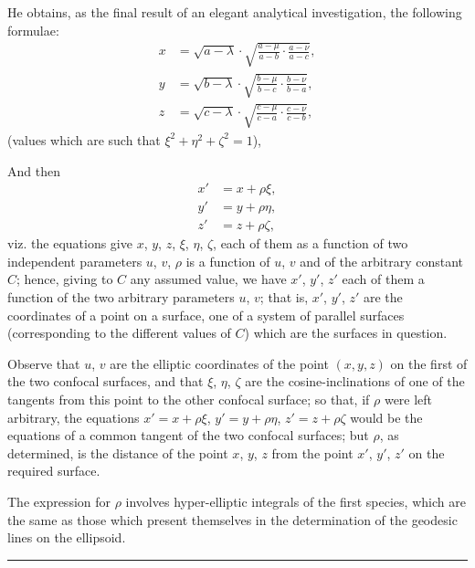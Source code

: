 \documentclass[11pt,a4paper]{article}
\theoremstyle{definition}
\begin{document}
He obtains, as the final result of an elegant analytical investigation, the following formulae:
\begin{align*}
x &= \sqrt{a - \lambda} \cdot \sqrt{\frac{a - \mu}{a - b} \cdot \frac{a - \nu}{a - c}}, \\
y &= \sqrt{b - \lambda} \cdot \sqrt{\frac{b - \mu}{b - c} \cdot \frac{b - \nu}{b - a}}, \\
z &= \sqrt{c - \lambda} \cdot \sqrt{\frac{c - \mu}{c - a} \cdot \frac{c - \nu}{c - b}},
\end{align*}
(values which are such that $\xi^2 + \eta^2 + \zeta^2 = 1$),

And then
\begin{align*}
x' &= x + \rho\xi, \\
y' &= y + \rho\eta, \\
z' &= z + \rho\zeta,
\end{align*}
viz. the equations give $x$, $y$, $z$, $\xi$, $\eta$, $\zeta$, each of them as a function of two independent parameters $u$, $v$, $\rho$ is a function of $u$, $v$ and of the arbitrary constant $C$; hence, giving to $C$ any assumed value, we have $x'$, $y'$, $z'$ each of them a function of the two arbitrary parameters $u$, $v$; that is, $x'$, $y'$, $z'$ are the coordinates of a point on a surface, one of a system of parallel surfaces (corresponding to the different values of $C$) which are the surfaces in question.

Observe that $u$, $v$ are the elliptic coordinates of the point $(x, y, z)$ on the first of the two confocal surfaces, and that $\xi$, $\eta$, $\zeta$ are the cosine-inclinations of one of the tangents from this point to the other confocal surface; so that, if $\rho$ were left arbitrary, the equations $x' = x + \rho\xi$, $y' = y + \rho\eta$, $z' = z + \rho\zeta$ would be the equations of a common tangent of the two confocal surfaces; but $\rho$, as determined, is the distance of the point $x$, $y$, $z$ from the point $x'$, $y'$, $z'$ on the required surface.

The expression for $\rho$ involves hyper-elliptic integrals of the first species, which are the same as those which present themselves in the determination of the geodesic lines on the ellipsoid.

\vspace{12pt}
\hrule
\vspace{12pt}

\end{document}
